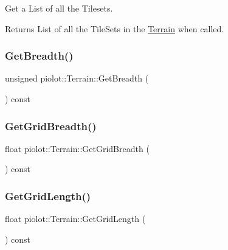 Get a List of all the Tilesets. 

\begin{DoxyReturn}{Returns}
List of all the Tile\+Sets in the \mbox{\hyperlink{classpiolot_1_1_terrain}{Terrain}} when called. 
\end{DoxyReturn}
\mbox{\label{classpiolot_1_1_terrain_a7fa4bf450e2545dbce46a870caa31aa2}} 
\subsubsection{\texorpdfstring{Get\+Breadth()}{GetBreadth()}}
{\footnotesize\ttfamily unsigned piolot\+::\+Terrain\+::\+Get\+Breadth (\begin{DoxyParamCaption}{ }\end{DoxyParamCaption}) const\hspace{0.3cm}{\ttfamily [inline]}}

\mbox{\label{classpiolot_1_1_terrain_acd20433446ca1eef57b1498e26aa0aca}} 
\subsubsection{\texorpdfstring{Get\+Grid\+Breadth()}{GetGridBreadth()}}
{\footnotesize\ttfamily float piolot\+::\+Terrain\+::\+Get\+Grid\+Breadth (\begin{DoxyParamCaption}{ }\end{DoxyParamCaption}) const\hspace{0.3cm}{\ttfamily [inline]}}

\mbox{\label{classpiolot_1_1_terrain_aa742fdf411184356e962f98d3785ec7c}} 
\subsubsection{\texorpdfstring{Get\+Grid\+Length()}{GetGridLength()}}
{\footnotesize\ttfamily float piolot\+::\+Terrain\+::\+Get\+Grid\+Length (\begin{DoxyParamCaption}{ }\end{DoxyParamCaption}) const\hspace{0.3cm}{\ttfamily [inline]}}

